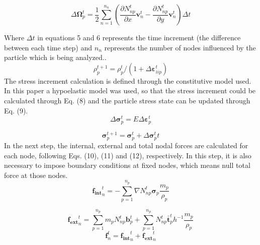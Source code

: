 \documentclass[preprint,12pt]{elsarticle}
\begin{document}
\begin{equation}
\Delta\boldsymbol{\Omega}_{p}^t = \frac{1}{2}\sum_{n=1}^{n_n}\left ( \frac{\partial N_{np}^t}{\partial x}\boldsymbol{v}_n^t-\frac{\partial N_{np}^t}{\partial y}\boldsymbol{v}_n^t \right )\Delta t 
\end{equation}

Where $\Delta t$ in equations 5 and 6 represents the time increment (the difference between each time step) and $n_n$ represents the number of nodes influenced by the particle which is being analyzed..
\begin{equation}
\rho_p^{t+1} = \rho_p^{t}/(1+\Delta\boldsymbol{\varepsilon}_{iip}^t)
\end{equation}
The stress increment calculation is defined through the constitutive model used. In this paper a hypoelastic model was used, so that the stress increment could be calculated through Eq. (8) and the particle stress state can be updated through Eq. (9).
\begin{equation}
\Delta \boldsymbol{\sigma }_p^t = E\Delta\boldsymbol{\varepsilon}_p^t
\end{equation}

\begin{equation}
\boldsymbol{\sigma }_p^{t+1} =\boldsymbol{\sigma }_p^{t} + \Delta \boldsymbol{\sigma }_p^tt
\end{equation}
In the next step, the internal, external and total nodal forces are calculated for each node, following Eqs. (10), (11) and (12), respectively. In this step, it is also necessary to impose boundary conditions at fixed nodes, which means null total force at those nodes.
\begin{equation}
\boldsymbol{f_{int}}_n^t = -\sum_{p=1}^{n_p}\nabla N_{np}^t\boldsymbol{\sigma}_p\frac{m_p}{\rho_p}
\end{equation}

\begin{equation}
\boldsymbol{f_{ext}}_n^t = \sum_{p=1}^{n_p}m_pN_{np}^t\boldsymbol{b}_p^t+\sum_{p=1}^{n_p} N_{np}^t\boldsymbol{\bar{t}}_p^th^{-1}\frac{m_p}{\rho_p}
\end{equation}
%
\begin{equation}
\boldsymbol{f}_n^t=\boldsymbol{f_{int}}_n^t+\boldsymbol{f_{ext}}_n^t
\end{equation}
\end{document}
